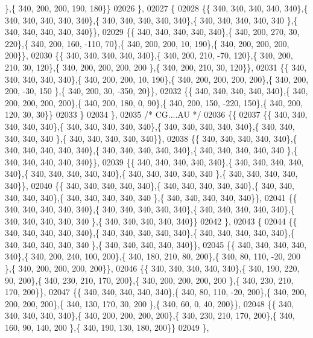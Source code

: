 \begin{DoxyCode}
      \},\{ 340, 200, 200, 190, 180\}\}
02026 \},
02027 \{
02028 \{\{ 340, 340, 340, 340, 340\},\{ 340, 340, 340, 340, 340\},\{ 340, 340, 340, 340, 340\},\{ 340, 340, 340, 340, 340
      \},\{ 340, 340, 340, 340, 340\}\},
02029 \{\{ 340, 340, 340, 340, 340\},\{ 340, 200, 270,  30, 220\},\{ 340, 200, 160, -110,  70\},\{ 340, 200, 200,  10, 
      190\},\{ 340, 200, 200, 200, 200\}\},
02030 \{\{ 340, 340, 340, 340, 340\},\{ 340, 200, 210, -70, 120\},\{ 340, 200, 210,  30, 120\},\{ 340, 200, 200, 200, 200
      \},\{ 340, 200, 210,  30, 120\}\},
02031 \{\{ 340, 340, 340, 340, 340\},\{ 340, 200, 200,  10, 190\},\{ 340, 200, 200, 200, 200\},\{ 340, 200, 200, -30, 150
      \},\{ 340, 200,  30, -350,  20\}\},
02032 \{\{ 340, 340, 340, 340, 340\},\{ 340, 200, 200, 200, 200\},\{ 340, 200, 180,   0,  90\},\{ 340, 200, 150, -220, 
      150\},\{ 340, 200, 120,  30,  30\}\}
02033 \}
02034 \},
02035 \textcolor{comment}{/* CG....AU */}
02036 \{\{
02037 \{\{ 340, 340, 340, 340, 340\},\{ 340, 340, 340, 340, 340\},\{ 340, 340, 340, 340, 340\},\{ 340, 340, 340, 340, 340
      \},\{ 340, 340, 340, 340, 340\}\},
02038 \{\{ 340, 340, 340, 340, 340\},\{ 340, 340, 340, 340, 340\},\{ 340, 340, 340, 340, 340\},\{ 340, 340, 340, 340, 340
      \},\{ 340, 340, 340, 340, 340\}\},
02039 \{\{ 340, 340, 340, 340, 340\},\{ 340, 340, 340, 340, 340\},\{ 340, 340, 340, 340, 340\},\{ 340, 340, 340, 340, 340
      \},\{ 340, 340, 340, 340, 340\}\},
02040 \{\{ 340, 340, 340, 340, 340\},\{ 340, 340, 340, 340, 340\},\{ 340, 340, 340, 340, 340\},\{ 340, 340, 340, 340, 340
      \},\{ 340, 340, 340, 340, 340\}\},
02041 \{\{ 340, 340, 340, 340, 340\},\{ 340, 340, 340, 340, 340\},\{ 340, 340, 340, 340, 340\},\{ 340, 340, 340, 340, 340
      \},\{ 340, 340, 340, 340, 340\}\}
02042 \},
02043 \{
02044 \{\{ 340, 340, 340, 340, 340\},\{ 340, 340, 340, 340, 340\},\{ 340, 340, 340, 340, 340\},\{ 340, 340, 340, 340, 340
      \},\{ 340, 340, 340, 340, 340\}\},
02045 \{\{ 340, 340, 340, 340, 340\},\{ 340, 200, 240, 100, 200\},\{ 340, 180, 210,  80, 200\},\{ 340,  80, 110, -20, 200
      \},\{ 340, 200, 200, 200, 200\}\},
02046 \{\{ 340, 340, 340, 340, 340\},\{ 340, 190, 220,  90, 200\},\{ 340, 230, 210, 170, 200\},\{ 340, 200, 200, 200, 200
      \},\{ 340, 230, 210, 170, 200\}\},
02047 \{\{ 340, 340, 340, 340, 340\},\{ 340,  80, 110, -20, 200\},\{ 340, 200, 200, 200, 200\},\{ 340, 130, 170,  30, 200
      \},\{ 340,  60,   0,  40, 200\}\},
02048 \{\{ 340, 340, 340, 340, 340\},\{ 340, 200, 200, 200, 200\},\{ 340, 230, 210, 170, 200\},\{ 340, 160,  90, 140, 200
      \},\{ 340, 190, 130, 180, 200\}\}
02049 \},

\end{DoxyCode}
